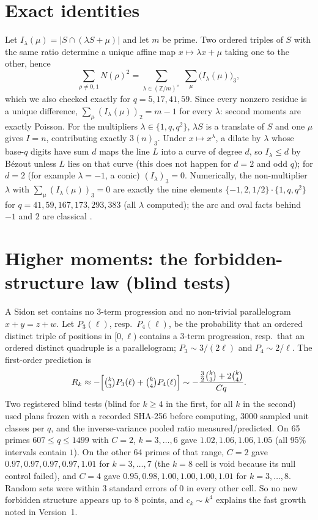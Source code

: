 \documentclass[11pt]{article}
\begin{document}
\section{Exact identities}
Let $I_\lambda(\mu)=|S\cap(\lambda S+\mu)|$ and let $m$ be prime. Two ordered triples of $S$ with the same ratio determine a unique affine map
$x\mapsto\lambda x+\mu$ taking one to the other, hence
\[\sum_{\rho\ne0,1}N(\rho)^2=\sum_{\lambda\in(\mathbb Z/m)^\times}\ \sum_{\mu}\bigl(I_\lambda(\mu)\bigr)_3,\]
which we also checked exactly for $q=5,17,41,59$. Since every nonzero residue is a unique difference, $\sum_\mu(I_\lambda(\mu))_2=m-1$
for every $\lambda$: second moments are exactly Poisson. For the multipliers $\lambda\in\{1,q,q^2\}$, $\lambda S$ is a translate of
$S$ and one $\mu$ gives $I=n$, contributing exactly $3(n)_3$. Under $x\mapsto x^\lambda$, a dilate by $\lambda$ whose base-$q$ digits
have sum $d$ maps the line $L$ into a curve of degree $d$, so $I_\lambda\le d$ by B\'ezout unless $L$ lies on that curve (this does not happen for $d=2$ and odd $q$); for $d=2$ (for example $\lambda=-1$, a
conic) $(I_\lambda)_3=0$. Numerically, the non-multiplier $\lambda$ with $\sum_\mu(I_\lambda(\mu))_3=0$ are exactly the nine elements
$\{-1,2,1/2\}\cdot\{1,q,q^2\}$ for $q=41,59,167,173,293,383$ (all $\lambda$ computed); the arc and oval facts behind $-1$ and $2$ are classical
\cite{JV,Pi}.

\section{Higher moments: the forbidden-structure law (blind tests)}
A Sidon set contains no 3-term progression and no non-trivial parallelogram $x+y=z+w$. Let $P_3(\ell)$, resp.\ $P_4(\ell)$, be the
probability that an ordered distinct triple of positions in $[0,\ell)$ contains a 3-term progression, resp.\ that an ordered distinct
quadruple is a parallelogram; $P_3\sim3/(2\ell)$ and $P_4\sim2/\ell$. The first-order prediction is
\[R_k\approx-\Bigl[\tbinom k3P_3(\ell)+\tbinom k4P_4(\ell)\Bigr]\sim-\frac{\tfrac32\binom k3+2\binom k4}{Cq}.\]
Two registered blind tests (blind for $k\ge4$ in the first, for all $k$ in the second) used plans frozen with a recorded SHA-256 before computing, 3000 sampled unit classes per $q$, and the
inverse-variance pooled ratio measured/predicted. On 65 primes $607\le q\le1499$ with $C=2$, $k=3,\dots,6$ gave $1.02,1.06,1.06,1.05$
(all 95\% intervals contain $1$). On the other 64 primes of that range, $C=2$ gave $0.97,0.97,0.97,0.97,1.01$ for $k=3,\dots,7$ (the
$k=8$ cell is void because its null control failed), and $C=4$ gave $0.95,0.98,1.00,1.00,1.00,1.01$ for $k=3,\dots,8$. Random sets were
within $3$ standard errors of $0$ in every other cell. So no new forbidden structure appears up to $8$ points, and $c_k\sim k^4$ explains the fast growth
noted in Version~1.
\end{document}
